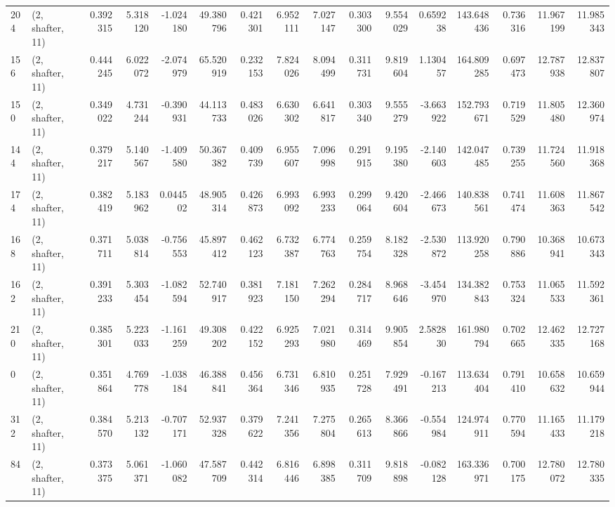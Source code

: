 \begin{tabular}{llrrrrrrrrrrrrrr}
204 &  (2, shafter, 11) &   0.392315 &   5.318120 &  -1.024180 &    49.380796 &   0.421301 &   6.952111 &   7.027147 &  0.303300 &   9.554029 &   0.659238 &   143.648436 &  0.736316 &  11.967199 &  11.985343 \\
156 &  (2, shafter, 11) &   0.444245 &   6.022072 &  -2.074979 &    65.520919 &   0.232153 &   7.824026 &   8.094499 &  0.311731 &   9.819604 &   1.130457 &   164.809285 &  0.697473 &  12.787938 &  12.837807 \\
150 &  (2, shafter, 11) &   0.349022 &   4.731244 &  -0.390931 &    44.113733 &   0.483026 &   6.630302 &   6.641817 &  0.303340 &   9.555279 &  -3.663922 &   152.793671 &  0.719529 &  11.805480 &  12.360974 \\
144 &  (2, shafter, 11) &   0.379217 &   5.140567 &  -1.409580 &    50.367382 &   0.409739 &   6.955607 &   7.096998 &  0.291915 &   9.195380 &  -2.140603 &   142.047485 &  0.739255 &  11.724560 &  11.918368 \\
174 &  (2, shafter, 11) &   0.382419 &   5.183962 &   0.044502 &    48.905314 &   0.426873 &   6.993092 &   6.993233 &  0.299064 &   9.420604 &  -2.466673 &   140.838561 &  0.741474 &  11.608363 &  11.867542 \\
168 &  (2, shafter, 11) &   0.371711 &   5.038814 &  -0.756553 &    45.897412 &   0.462123 &   6.732387 &   6.774763 &  0.259754 &   8.182328 &  -2.530872 &   113.920258 &  0.790886 &  10.368941 &  10.673343 \\
162 &  (2, shafter, 11) &   0.391233 &   5.303454 &  -1.082594 &    52.740917 &   0.381923 &   7.181150 &   7.262294 &  0.284717 &   8.968646 &  -3.454970 &   134.382843 &  0.753324 &  11.065533 &  11.592361 \\
210 &  (2, shafter, 11) &   0.385301 &   5.223033 &  -1.161259 &    49.308202 &   0.422152 &   6.925293 &   7.021980 &  0.314469 &   9.905854 &   2.582830 &   161.980794 &  0.702665 &  12.462335 &  12.727168 \\
0   &  (2, shafter, 11) &   0.351864 &   4.769778 &  -1.038184 &    46.388841 &   0.456364 &   6.731346 &   6.810935 &  0.251728 &   7.929491 &  -0.167213 &   113.634404 &  0.791410 &  10.658632 &  10.659944 \\
312 &  (2, shafter, 11) &   0.384570 &   5.213132 &  -0.707171 &    52.937328 &   0.379622 &   7.241356 &   7.275804 &  0.265613 &   8.366866 &  -0.554984 &   124.974911 &  0.770594 &  11.165433 &  11.179218 \\
84  &  (2, shafter, 11) &   0.373375 &   5.061371 &  -1.060082 &    47.587709 &   0.442314 &   6.816446 &   6.898385 &  0.311709 &   9.818898 &  -0.082128 &   163.336971 &  0.700175 &  12.780072 &  12.780335 \\

\end{tabular}
